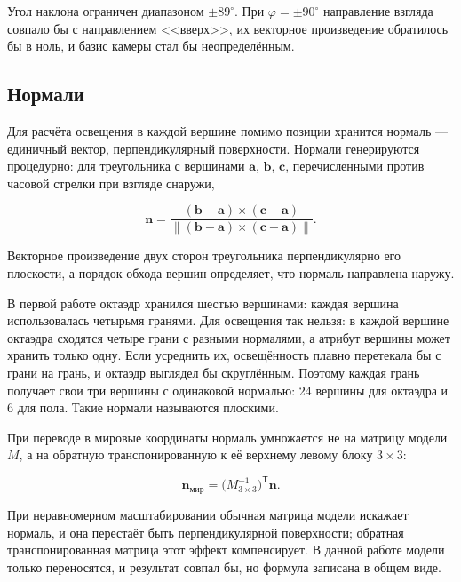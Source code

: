 \documentclass[14pt,a4paper]{extarticle}
\begin{document}
Угол наклона ограничен диапазоном $\pm 89^\circ$. При $\varphi = \pm 90^\circ$
направление взгляда совпало бы с направлением <<вверх>>, их векторное
произведение обратилось бы в ноль, и базис камеры стал бы неопределённым.

\subsection{Нормали}

Для расчёта освещения в каждой вершине помимо позиции хранится нормаль —
единичный вектор, перпендикулярный поверхности. Нормали генерируются
процедурно: для треугольника с вершинами $\mathbf{a}$, $\mathbf{b}$,
$\mathbf{c}$, перечисленными против часовой стрелки при взгляде снаружи,

\begin{equation}
	\mathbf{n} = \frac{(\mathbf{b} - \mathbf{a}) \times (\mathbf{c} - \mathbf{a})}
	                  {\bigl\|(\mathbf{b} - \mathbf{a}) \times (\mathbf{c} - \mathbf{a})\bigr\|}.
	\label{eq:normal}
\end{equation}

Векторное произведение двух сторон треугольника перпендикулярно его плоскости,
а порядок обхода вершин определяет, что нормаль направлена наружу.

В первой работе октаэдр хранился шестью вершинами: каждая вершина использовалась
четырьмя гранями. Для освещения так нельзя: в каждой вершине октаэдра сходятся
четыре грани с разными нормалями, а атрибут вершины может хранить только одну.
Если усреднить их, освещённость плавно перетекала бы с грани на грань, и
октаэдр выглядел бы скруглённым. Поэтому каждая грань получает свои три
вершины с одинаковой нормалью: 24 вершины для октаэдра и 6 для пола. Такие
нормали называются плоскими.

При переводе в мировые координаты нормаль умножается не на матрицу модели $M$,
а на обратную транспонированную к её верхнему левому блоку $3\times3$:

\begin{equation}
	\mathbf{n}_{\text{мир}} = \bigl(M_{3\times3}^{-1}\bigr)^{\mathsf{T}} \mathbf{n}.
\end{equation}

При неравномерном масштабировании обычная матрица модели искажает нормаль, и
она перестаёт быть перпендикулярной поверхности; обратная транспонированная
матрица этот эффект компенсирует. В данной работе модели только переносятся, и
результат совпал бы, но формула записана в общем виде.
\end{document}
